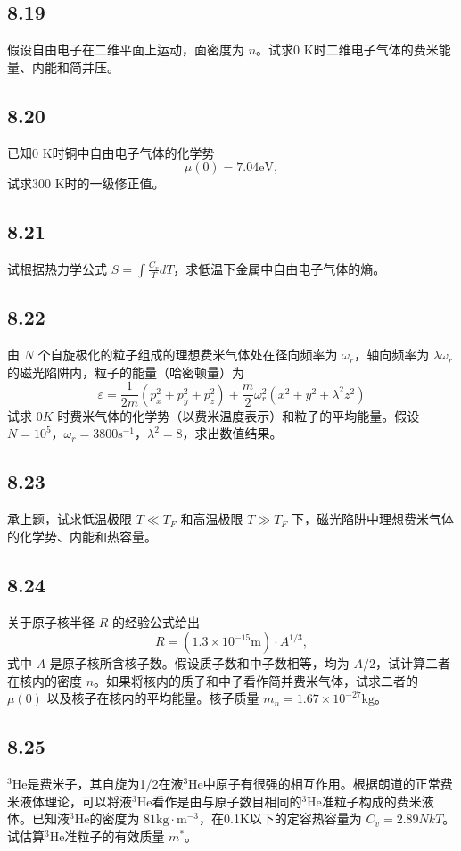 \subsection{8.19}
假设自由电子在二维平面上运动，面密度为 $n$。试求0 K时二维电子气体的费米能量、内能和简并压。

\newpage
\subsection{8.20}
已知0 K时铜中自由电子气体的化学势
$$ \mu(0) = 7.04\mathrm{eV}, $$
试求300 K时的一级修正值。

\newpage
\subsection{8.21}
试根据热力学公式 $S = \int \frac{C_v}{T} dT$，求低温下金属中自由电子气体的熵。

\newpage
\subsection{8.22}
由 $N$ 个自旋极化的粒子组成的理想费米气体处在径向频率为 $\omega_r$，轴向频率为 $\lambda \omega_r$ 的磁光陷阱内，粒子的能量（哈密顿量）为
$$ \varepsilon = \frac{1}{2m} \left( p_x^2 + p_y^2 + p_z^2 \right) + \frac{m}{2} \omega_r^2 \left( x^2 + y^2 + \lambda^2 z^2 \right) $$
试求 $0 K$ 时费米气体的化学势（以费米温度表示）和粒子的平均能量。假设 $N = 10^5$，$\omega_r = 3800\mathrm{s}^{-1}$，$\lambda^2 = 8$，求出数值结果。

\newpage
\subsection{8.23}
承上题，试求低温极限 $T \ll T_F$ 和高温极限 $T \gg T_F$ 下，磁光陷阱中理想费米气体的化学势、内能和热容量。

\newpage
\subsection{8.24}
关于原子核半径 $R$ 的经验公式给出
$$ R = (1.3 \times 10^{-15} \mathrm{m}) \cdot A^{1/3}, $$
式中 $A$ 是原子核所含核子数。假设质子数和中子数相等，均为 $A/2$，试计算二者在核内的密度 $n$。如果将核内的质子和中子看作简并费米气体，试求二者的 $\mu(0)$ 以及核子在核内的平均能量。核子质量 $m_n = 1.67 \times 10^{-27} \mathrm{kg}$。

\newpage
\subsection{8.25}
$^3$He是费米子，其自旋为1/2在液$^3$He中原子有很强的相互作用。根据朗道的正常费米液体理论，可以将液$^3$He看作是由与原子数目相同的$^3$He准粒子构成的费米液体。已知液$^3$He的密度为 $81 \mathrm{kg} \cdot \mathrm{m}^{-3}$，在0.1K以下的定容热容量为 $C_v = 2.89 NkT$。试估算$^3$He准粒子的有效质量 $m^*$。

